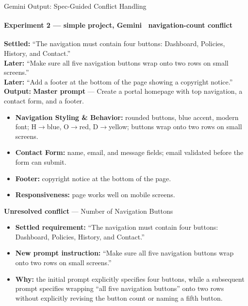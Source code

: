\documentclass[aspectratio=169,11pt,c]{beamer}
\begin{document}
\begin{frame}{Gemini Output: Spec-Guided Conflict Handling}
  \framesubtitle{Experiment 2 --- simple project, Gemini \textperiodcentered\ navigation-count conflict}
  \begin{quotebox}
    \scriptsize
    \textbf{\color{primaryblue}Settled:} ``The navigation must contain four buttons: Dashboard, Policies, History, and Contact.''\\[1pt]
    \textbf{\color{primaryblue}Later:} ``Make sure all five navigation buttons wrap onto two rows on small screens.''\\[1pt]
    \textbf{\color{primaryblue}Later:} ``Add a footer at the bottom of the page showing a copyright notice.''\\[2pt]
    \textbf{\color{primaryblue}Output:} \textbf{Master prompt} --- Create a portal homepage with top navigation, a contact form, and a footer.
    \vspace{-3pt}
    \begin{itemize}\tiny
      \item \textbf{Navigation Styling \& Behavior:} rounded buttons, blue accent, modern font; H$\to$blue, O$\to$red, D$\to$yellow; buttons wrap onto two rows on small screens.
      \item \textbf{Contact Form:} name, email, and message fields; email validated before the form can submit.
      \item \textbf{Footer:} copyright notice at the bottom of the page.
      \item \textbf{Responsiveness:} page works well on mobile screens.
    \end{itemize}
    \textbf{Unresolved conflict} --- Number of Navigation Buttons
    \vspace{-3pt}
    \begin{itemize}\tiny
      \item \textbf{Settled requirement:} ``The navigation must contain four buttons: Dashboard, Policies, History, and Contact.''
      \item \textbf{New prompt instruction:} ``Make sure all five navigation buttons wrap onto two rows on small screens.''
      \item \textbf{Why:} the initial prompt explicitly specifies four buttons, while a subsequent prompt specifies wrapping ``all five navigation buttons'' onto two rows without explicitly revising the button count or naming a fifth button.
    \end{itemize}
  \end{quotebox}
\end{frame}
\end{document}
